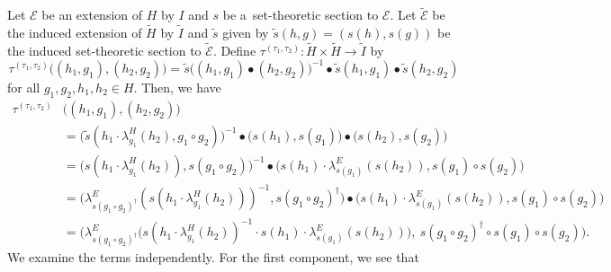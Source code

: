 \documentclass{jonasart}
\theoremstyle{plain}
\begin{document}
	Let $\mathcal{E}$ be an extension of $H$ by $I$ and $s$ be a~set-theoretic section to $\mathcal{E}$. Let $\widetilde{\mathcal{E}}$ be the induced extension of $\widetilde{H}$ by $\widetilde{I}$ and $\widetilde{s}$ given by $\widetilde{s}(h,g)=(s(h),s(g))$ be the induced set-theoretic section to $\widetilde{\mathcal{E}}$. Define $\tau^{(\tau_1,\tau_2 )}\colon \widetilde{H} \times \widetilde{H} \to \widetilde{I}$ by
	\[
	\tau^{(\tau_1,\tau_2)} \big((h_1,g_1),(h_2,g_2)\big)=\widetilde{s} \big((h_1,g_1) \bullet (h_2,g_2)\big)^{-1} \bullet \widetilde{s}(h_1,g_1) \bullet \widetilde{s}(h_2,g_2)
	\]
	for all $g_1, g_2, h_1, h_2 \in H$. Then, we have
	\begin{align}
		\tau^{(\tau_1,\tau_2 )}&\big((h_1,g_1 ),(h_2,g_2 )\big) \nonumber\\
		&= \big(\widetilde{s}(h_1\cdot \lambda^H_{g_1}(h_2 ),g_1\circ g_2 )\big)^{-1} \bullet \big(s(h_1 ),s(g_1 )\big) \bullet \big(s(h_2 ),s(g_2 )\big)\nonumber\\
		&= \big(s(h_1\cdot \lambda^H_{g_1}(h_2 )),s(g_1\circ g_2 )\big)^{-1} \bullet \big(s(h_1 )\cdot \lambda^E_{s(g_1 )}(s(h_2 )),s(g_1 )\circ s(g_2 ) \big)\nonumber\\
		&=\big(\lambda^E_{s(g_1\circ g_2 )^\dagger}(s(h_1\cdot \lambda^H_{g_1}(h_2 )))^{-1},s(g_1\circ g_2 )^\dagger\big) \bullet \big(s(h_1 )\cdot \lambda^E_{s(g_1 )}(s(h_2 )),s(g_1 )\circ s(g_2 )\big)\nonumber\\
		&=\big(\lambda^E_{s(g_1\circ g_2 )^\dagger} \big(s(h_1 \cdot \lambda^H_{g_1}(h_2 ))^{-1}\cdot s(h_1 )\cdot \lambda^E_{s(g_1 )}(s(h_2 ))\big),~s(g_1\circ g_2 )^\dagger\circ s(g_1 )\circ s(g_2 ) \big).\label{tau des}
	\end{align}
	We examine the terms independently. For the first component, we see that
\end{document}
